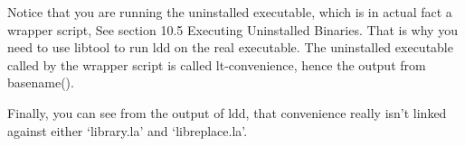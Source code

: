  Notice that you are running the uninstalled executable, which is in actual fact a wrapper script, See section 10.5 Executing Uninstalled Binaries. That is why you need to use libtool to run ldd on the real executable. The uninstalled executable called by the wrapper script is called lt-convenience, hence the output from basename().

Finally, you can see from the output of ldd, that convenience really isn't linked against either `library.la' and `libreplace.la'.
